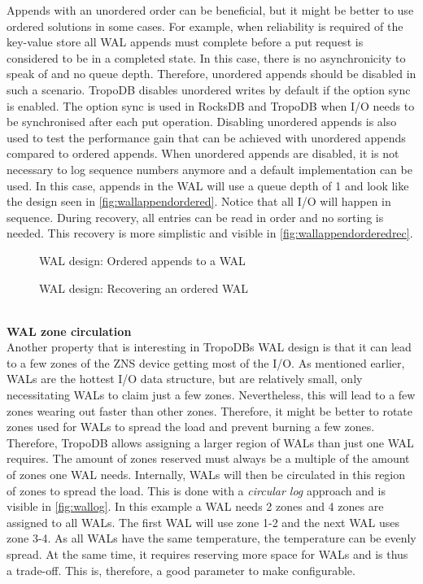 Appends with an unordered order can be beneficial, but it might be better to use ordered solutions in some cases. For example, when reliability is required of the key-value store all WAL appends must complete before a put request is considered to be in a completed state. In this case, there is no asynchronicity to speak of and no queue depth. Therefore, unordered appends should be disabled in such a scenario. TropoDB disables unordered writes by default if the option sync is enabled. The option sync is used in RocksDB and TropoDB when I/O needs to be synchronised after each put operation. Disabling unordered appends is also used to test the performance gain that can be achieved with unordered appends compared to ordered appends. When unordered appends are disabled, it is not necessary to log sequence numbers anymore and a default implementation can be used. In this case, appends in the WAL will use a queue depth of 1 and look like the design seen in \autoref{fig:wallappendordered}. Notice that all I/O will happen in sequence. During recovery, all entries can be read in order and no sorting is needed. This recovery is more simplistic and visible in \autoref{fig:wallappendorderedrec}.
\begin{figure}[h]
\centering
\begin{minipage}{0.75\textwidth}
  \centering
  
\end{minipage}%
\caption{ WAL design: Ordered appends to a WAL}
\label{fig:wallappendordered}
\end{figure}
\begin{figure}[h]
\centering
\begin{minipage}{0.75\textwidth}
  \centering
  
\end{minipage}%
\caption{ WAL design: Recovering an ordered WAL}
\label{fig:wallappendorderedrec}
\end{figure} \\
\textbf{WAL zone circulation}\\
Another property that is interesting in TropoDBs WAL design is that it can lead to a few zones of the ZNS device getting most of the I/O. As mentioned earlier, WALs are the hottest I/O data structure, but are relatively small, only necessitating WALs to claim just a few zones. Nevertheless, this will lead to a few zones wearing out faster than other zones. Therefore, it might be better to rotate zones used for WALs to spread the load and prevent burning a few zones. Therefore, TropoDB allows assigning a larger region of WALs than just one WAL requires. The amount of zones reserved must always be a multiple of the amount of zones one WAL needs. Internally, WALs will then be circulated in this region of zones to spread the load. This is done with a \textit{circular log} approach and is visible in \autoref{fig:wallog}. In this example a WAL needs 2 zones and 4 zones are assigned to all WALs. The first WAL will use zone 1-2 and the next WAL uses zone 3-4. As all WALs have the same temperature, the temperature can be evenly spread. At the same time, it requires reserving more space for WALs and is thus a trade-off. This is, therefore, a good parameter to make configurable. 
